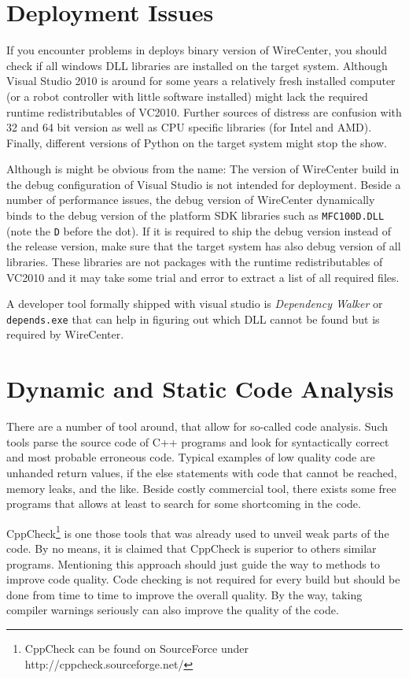 \documentclass[11pt,a4paper,onepage,openany]{book}
\begin{document}
\section{Deployment Issues}
If you encounter problems in deploys binary version of WireCenter, you should
check if all windows DLL libraries are installed on the target system. Although
Visual Studio 2010 is around for some years a relatively fresh installed
computer (or a robot controller with little software installed) might lack the
required runtime redistributables of VC2010. Further sources of distress are
confusion with 32 and 64 bit version as well as CPU specific libraries (for
Intel and AMD). Finally, different versions of Python on the target system
might stop the show.

Although is might be obvious from the name: The version of WireCenter build in
the debug configuration of Visual Studio is not intended for deployment. Beside
a number of performance issues, the debug version of WireCenter dynamically
binds to the debug version of the platform SDK libraries such as
\texttt{MFC100D.DLL} (note the \texttt{D} before the dot). If it is required to
ship the debug version instead of the release version, make sure that the
target system has also debug version of all libraries. These libraries are not
packages with the runtime redistributables of VC2010 and it may take some trial
and error to extract a list of all required files.

A developer tool formally shipped with visual studio is \emph{Dependency
Walker} or \texttt{depends.exe} that can help in figuring out which DLL cannot
be found but is required by WireCenter.

\section{Dynamic and Static Code Analysis}
There are a number of tool around, that allow for so-called code analysis. Such
tools parse the source code of C++ programs and look for syntactically correct
and most probable erroneous code. Typical examples of low quality code are
unhanded return values, if the else statements with code that cannot be
reached, memory leaks, and the like. Beside costly commercial tool, there
exists some free programs that allows at least to search for some shortcoming
in the code.

CppCheck\footnote{CppCheck can be found on SourceForce under
http://cppcheck.sourceforge.net/} is one those tools that was already used to
unveil weak parts of the code. By no means, it is claimed that CppCheck is
superior to others similar programs. Mentioning this approach should just guide
the way to methods to improve code quality. Code checking is not required for
every build but should be done from time to time to improve the overall
quality. By the way, taking compiler warnings seriously can also improve the
quality of the code.
\end{document}
